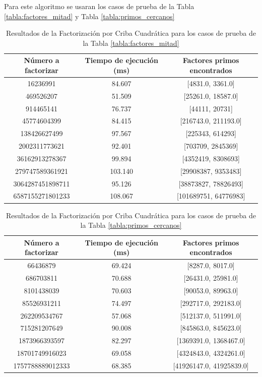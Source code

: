     Para este algoritmo se usaran los casos de prueba de la Tabla \ref{tabla:factores_mitad} y Tabla \ref{tabla:primos_cercanos}
    \begin{table}[H]
        \centering
        \begin{tabular}{ccc}
        \toprule
        Número a factorizar & Tiempo de ejecución (ms) & Factores primos encontrados\\
        \midrule
        16236991 & 84.607 & [4831.0, 3361.0]\\
        469526207 & 51.509 & [25261.0, 18587.0]\\
        914465141 & 76.737 & [44111, 20731]\\
        45774604399 & 84.415 & [216743.0, 211193.0]\\
        138426627499 & 97.567 & [225343, 614293]\\
        2002311773621 & 92.401 & [703709, 2845369]\\
        36162913278367 & 99.894 & [4352419, 8308693]\\
        279747589361921 & 103.140 & [29908387, 9353483]\\
        3064287451898711 & 95.126 & [38873827, 78826493]\\
        6587155271801233 & 108.067 & [101689751, 64776983]\\

        \bottomrule
        \end{tabular}
        \caption{Resultados de la Factorización por Criba Cuadrática para los casos de prueba de la Tabla \ref{tabla:factores_mitad}}
        \label{tab:res-qs-mitad}
    \end{table}

    \begin{table}[H]
        \centering
        \begin{tabular}{ccc}
        \toprule
        Número a factorizar & Tiempo de ejecución (ms) & Factores primos encontrados\\
        \midrule
        66436879 & 69.424 & [8287.0, 8017.0]\\
        686703811 & 70.688 & [26431.0, 25981.0]\\
        8101438039 & 70.603 & [90053.0, 89963.0]\\
        85526931211 & 74.497 & [292717.0, 292183.0]\\
        262209534767 & 57.068 & [512137.0, 511991.0]\\
        715281207649 & 90.008 & [845863.0, 845623.0]\\
        1873966393597 & 82.297 & [1369391.0, 1368467.0]\\
        18701749916023 & 69.058 & [4324843.0, 4324261.0]\\
        1757788889012333 & 68.385 & [41926147.0, 41925839.0]\\
        \bottomrule
        \end{tabular}
        \caption{Resultados de la Factorización por Criba Cuadrática para los casos de prueba de la Tabla \ref{tabla:primos_cercanos}}
        \label{tab:res-qs-cercano}
    \end{table}

